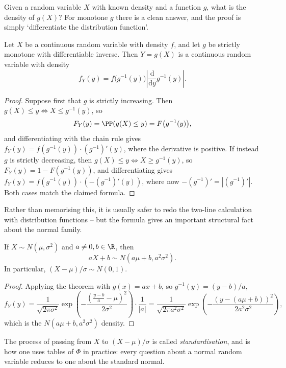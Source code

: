 Given a random variable $X$ with known density and a function $g$, what is the density of $g(X)$? For monotone $g$ there is a clean answer, and the proof is simply `differentiate the distribution function'.

\begin{theorem}
	Let $X$ be a continuous random variable with density $f$, and let $g$ be strictly monotone with differentiable inverse. Then $Y = g(X)$ is a continuous random variable with density
	$$
	f_Y(y) = f\big(g^{-1}(y)\big) \left|\frac{\mathrm{d}}{\mathrm{d}y} g^{-1}(y)\right|.
	$$
\end{theorem}
\begin{proof}
	Suppose first that $g$ is strictly increasing. Then $g(X) \leq y \iff X \leq g^{-1}(y)$, so
	$$
	F_Y(y) = \PP(g(X) \leq y) = F\big(g^{-1}(y)\big),
	$$
	and differentiating with the chain rule gives $f_Y(y) = f(g^{-1}(y)) \cdot (g^{-1})'(y)$, where the derivative is positive. If instead $g$ is strictly decreasing, then $g(X) \leq y \iff X \geq g^{-1}(y)$, so $F_Y(y) = 1 - F(g^{-1}(y))$, and differentiating gives $f_Y(y) = f(g^{-1}(y)) \cdot \left(-(g^{-1})'(y)\right)$, where now $-(g^{-1})' = |(g^{-1})'|$. Both cases match the claimed formula.
\end{proof}

Rather than memorising this, it is usually safer to redo the two-line calculation with distribution functions -- but the formula gives an important structural fact about the normal family.

\begin{corollary}
	If $X \sim N(\mu, \sigma^2)$ and $a \neq 0, b \in \R$, then
	$$
	aX + b \sim N(a\mu + b, a^2\sigma^2).
	$$
	In particular, $(X - \mu)/\sigma \sim N(0,1)$.
\end{corollary}
\begin{proof}
	Applying the theorem with $g(x) = ax + b$, so $g^{-1}(y) = (y - b)/a$,
	$$
	f_Y(y) = \frac{1}{\sqrt{2\pi\sigma^2}}\exp\left(-\frac{(\frac{y - b}{a} - \mu)^2}{2\sigma^2}\right)\cdot\frac{1}{|a|} = \frac{1}{\sqrt{2\pi a^2\sigma^2}}\exp\left(-\frac{(y - (a\mu + b))^2}{2a^2\sigma^2}\right),
	$$
	which is the $N(a\mu + b, a^2\sigma^2)$ density.
\end{proof}

The process of passing from $X$ to $(X - \mu)/\sigma$ is called \emph{standardisation}, and is how one uses tables of $\Phi$ in practice: every question about a normal random variable reduces to one about the standard normal.


